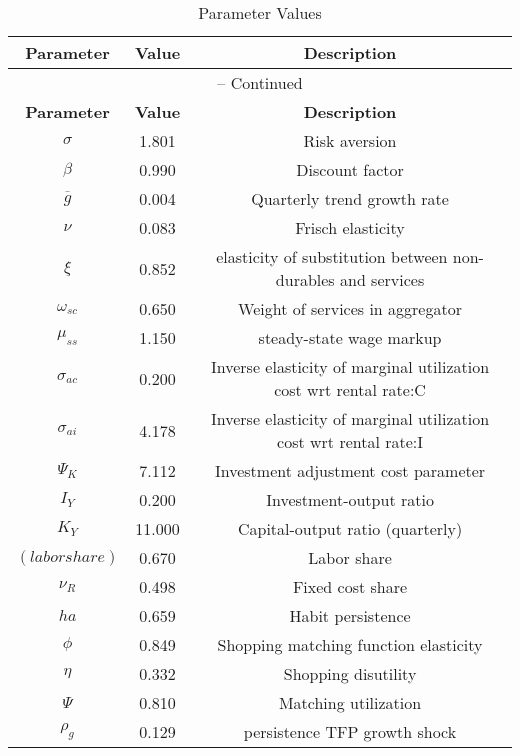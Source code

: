 \begin{center}
\begin{longtable}{ccc}
\caption{Parameter Values}\\%
\toprule%
\multicolumn{1}{c}{\textbf{Parameter}} &
\multicolumn{1}{c}{\textbf{Value}} &
 \multicolumn{1}{c}{\textbf{Description}}\\%
\midrule%
\endfirsthead
\multicolumn{3}{c}{{\tablename} \thetable{} -- Continued}\\%
\midrule%
\multicolumn{1}{c}{\textbf{Parameter}} &
\multicolumn{1}{c}{\textbf{Value}} &
  \multicolumn{1}{c}{\textbf{Description}}\\%
\midrule%
\endhead
${\sigma}$ 	 & 	 1.801 	 & 	 Risk aversion\\
${\beta}$ 	 & 	 0.990 	 & 	 Discount factor\\
${\overline{g}}$ 	 & 	 0.004 	 & 	 Quarterly trend growth rate\\
$\nu$ 	 & 	 0.083 	 & 	 Frisch elasticity\\
$\xi$ 	 & 	 0.852 	 & 	 elasticity of substitution between non-durables and services\\
$\omega_{sc}$ 	 & 	 0.650 	 & 	 Weight of services in aggregator\\
$\mu_{ss}$ 	 & 	 1.150 	 & 	 steady-state wage markup\\
${\sigma_{ac}}$ 	 & 	 0.200 	 & 	 Inverse elasticity of marginal utilization cost wrt rental rate:C\\
${\sigma_{ai}}$ 	 & 	 4.178 	 & 	 Inverse elasticity of marginal utilization cost wrt rental rate:I\\
${\Psi_{K}}$ 	 & 	 7.112 	 & 	 Investment adjustment cost parameter\\
${I_Y}$ 	 & 	 0.200 	 & 	 Investment-output ratio\\
${K_Y}$ 	 & 	 11.000 	 & 	 Capital-output ratio (quarterly)\\
$(labor share)$ 	 & 	 0.670 	 & 	 Labor share\\
${\nu_R}$ 	 & 	 0.498 	 & 	 Fixed cost share\\
${ha}$ 	 & 	 0.659 	 & 	 Habit persistence\\
${\phi}$ 	 & 	 0.849 	 & 	 Shopping matching function elasticity\\
${\eta}$ 	 & 	 0.332 	 & 	 Shopping disutility\\
${\Psi}$ 	 & 	 0.810 	 & 	 Matching utilization\\
${\rho_g}$ 	 & 	 0.129 	 & 	 persistence TFP growth shock\\

\end{longtable}
\end{center}
